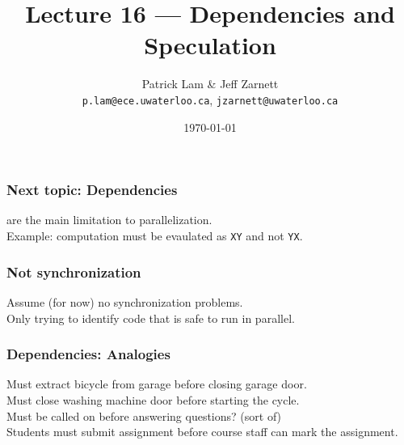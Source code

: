 
\usepackage{multirow}

\title{Lecture 16 --- Dependencies and Speculation }

\author{Patrick Lam \& Jeff Zarnett \\ \small \texttt{p.lam@ece.uwaterloo.ca}, \texttt{jzarnett@uwaterloo.ca}}
\date{\today}




\begin{frame}
  \titlepage

 \end{frame}

\begin{frame}
  \frametitle{Next topic: Dependencies}

  
      are the main
      limitation to parallelization.\\[1em]
     Example: computation must be evaulated as {\tt XY} and not {\tt YX}.\\[1em]
  
\end{frame}

\begin{frame}
  \frametitle{Not synchronization}

  
      Assume (for now) no synchronization problems.\\[1em]
      Only trying to identify code that is safe to run in
      parallel.

  
\end{frame}

\begin{frame}
\frametitle{Dependencies: Analogies}

Must extract bicycle from garage before closing garage door.\\[1em]

Must close washing machine door before starting the cycle.\\[1em]

Must be called on before answering questions? (sort of)\\[1em]

Students must submit assignment before course staff can mark the assignment.

\end{frame}

